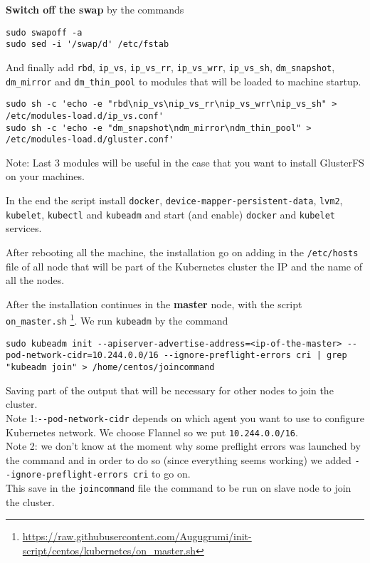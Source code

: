 \textbf{Switch off the swap} by the commands

\begin{lstlisting}
sudo swapoff -a
sudo sed -i '/swap/d' /etc/fstab
\end{lstlisting}

And finally add \texttt{rbd}, \texttt{ip\_vs}, \texttt{ip\_vs\_rr},
\texttt{ip\_vs\_wrr}, \texttt{ip\_vs\_sh}, \texttt{dm\_snapshot},
\texttt{dm\_mirror} and \texttt{dm\_thin\_pool} to modules that will be
loaded to machine startup.

\begin{lstlisting}
sudo sh -c 'echo -e "rbd\nip_vs\nip_vs_rr\nip_vs_wrr\nip_vs_sh" >  /etc/modules-load.d/ip_vs.conf'
sudo sh -c 'echo -e "dm_snapshot\ndm_mirror\ndm_thin_pool" >  /etc/modules-load.d/gluster.conf'
\end{lstlisting}

Note: Last 3 modules will be useful in the case that you want to install
GlusterFS on your machines.

In the end the script install \texttt{docker},
\texttt{device-mapper-persistent-data}, \texttt{lvm2}, \texttt{kubelet},
\texttt{kubectl} and \texttt{kubeadm} and start (and enable)
\texttt{docker} and \texttt{kubelet} services.

After rebooting all the machine, the installation go on adding in the
\texttt{/etc/hosts} file of all node that will be part of the Kubernetes
cluster the IP and the name of all the nodes.

After the installation continues in the \textbf{master} node, with the script
\verb!on_master.sh!
\footnote{\url{https://raw.githubusercontent.com/Augugrumi/init-script/centos/kubernetes/on_master.sh}}.
We run \texttt{kubeadm} by the command

\begin{lstlisting}
sudo kubeadm init --apiserver-advertise-address=<ip-of-the-master> --pod-network-cidr=10.244.0.0/16 --ignore-preflight-errors cri | grep "kubeadm join" > /home/centos/joincommand
\end{lstlisting}

Saving part of the output that will be necessary for other nodes to join
the cluster.\\
Note 1:\texttt{-\/-pod-network-cidr} depends on which agent you want to
use to configure Kubernetes network. We choose Flannel so we put
\texttt{10.244.0.0/16}.\\
Note 2: we don't know at the moment why some preflight errors was
launched by the command and in order to do so (since everything seems
working) we added \texttt{-\/-ignore-preflight-errors\ cri} to go on.\\
This save in the \texttt{joincommand} file the command to be run on
slave node to join the cluster.

